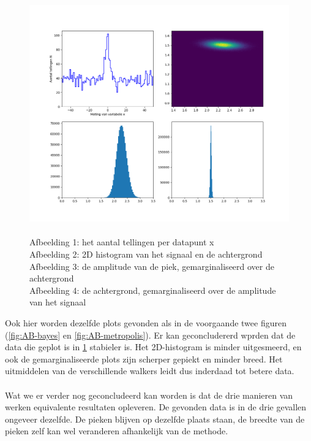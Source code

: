 \begin{figure}
    \centering
    \includegraphics[width=0.95\linewidth]{Figures/emcee_hist_AB.png}
    \caption{\\Afbeelding 1: het aantal tellingen per datapunt x\\
    Afbeelding 2: 2D histogram van het signaal en de achtergrond \\
    Afbeelding 3: de amplitude van de piek, gemarginaliseerd over de achtergrond\\
    Afbeelding 4: de achtergrond, gemarginaliseerd over de amplitude van het signaal}
    \label{fig:AB_emcee}
\end{figure}
Ook hier worden dezelfde plots gevonden als in de voorgaande twee figuren (\cref{fig:AB-bayes} en \cref{fig:AB-metropolis}). Er kan geconcludererd wprden dat de data die geplot is in \cref{fig:AB_emcee} stabieler is. Het 2D-histogram is minder uitgesmeerd, en ook de gemarginaliseerde plots zijn scherper gepiekt en minder breed. Het uitmiddelen van de verschillende walkers leidt dus inderdaad tot betere data.\\ \\
Wat we er verder nog geconcludeerd kan worden is dat de drie manieren van werken equivalente resultaten opleveren. De gevonden data is in de drie gevallen ongeveer dezelfde. De pieken blijven op dezelfde plaats staan, de breedte van de pieken zelf kan wel veranderen afhankelijk van de methode.
